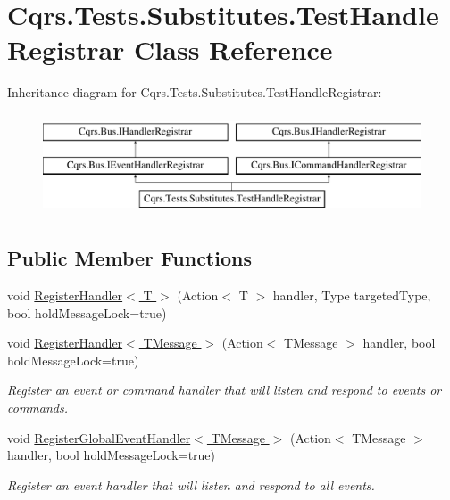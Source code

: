 \hypertarget{classCqrs_1_1Tests_1_1Substitutes_1_1TestHandleRegistrar}{}\section{Cqrs.\+Tests.\+Substitutes.\+Test\+Handle\+Registrar Class Reference}
\label{classCqrs_1_1Tests_1_1Substitutes_1_1TestHandleRegistrar}
Inheritance diagram for Cqrs.\+Tests.\+Substitutes.\+Test\+Handle\+Registrar\+:\begin{figure}[H]
\begin{center}
\leavevmode
\includegraphics[height=3.000000cm]{classCqrs_1_1Tests_1_1Substitutes_1_1TestHandleRegistrar}
\end{center}
\end{figure}
\subsection*{Public Member Functions}
\begin{DoxyCompactItemize}
\item 
void \hyperlink{classCqrs_1_1Tests_1_1Substitutes_1_1TestHandleRegistrar_a0c594dfb7108ec35a3b226fcc2ab84e2_a0c594dfb7108ec35a3b226fcc2ab84e2}{Register\+Handler$<$ T $>$} (Action$<$ T $>$ handler, Type targeted\+Type, bool hold\+Message\+Lock=true)
\item 
void \hyperlink{classCqrs_1_1Tests_1_1Substitutes_1_1TestHandleRegistrar_a8eb57abc3420b0968c08c05204caa25c_a8eb57abc3420b0968c08c05204caa25c}{Register\+Handler$<$ T\+Message $>$} (Action$<$ T\+Message $>$ handler, bool hold\+Message\+Lock=true)
\begin{DoxyCompactList}\small\item\em Register an event or command handler that will listen and respond to events or commands. \end{DoxyCompactList}\item 
void \hyperlink{classCqrs_1_1Tests_1_1Substitutes_1_1TestHandleRegistrar_a6fd2aec4c9924697b2d025d55c085502_a6fd2aec4c9924697b2d025d55c085502}{Register\+Global\+Event\+Handler$<$ T\+Message $>$} (Action$<$ T\+Message $>$ handler, bool hold\+Message\+Lock=true)
\begin{DoxyCompactList}\small\item\em Register an event handler that will listen and respond to all events. \end{DoxyCompactList}\end{DoxyCompactItemize}
